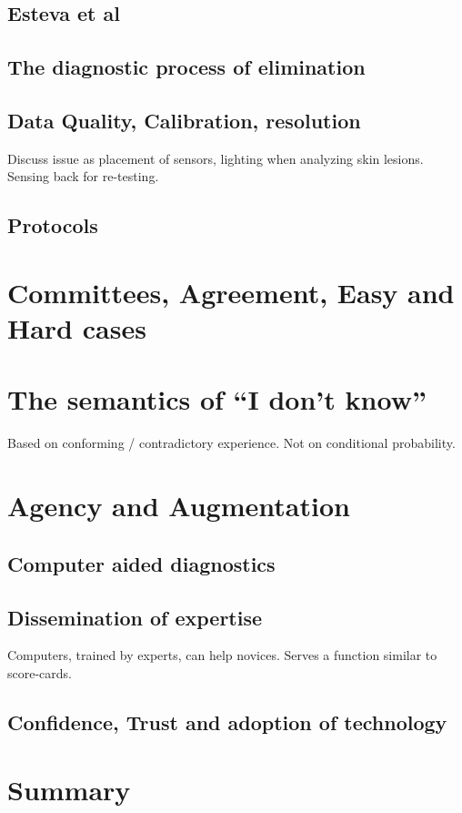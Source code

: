 \documentclass[fleqn,10pt]{wlscirep}
\begin{document}
\subsection*{Esteva et al}
\subsection*{The diagnostic process of elimination}
\subsection*{Data Quality, Calibration, resolution}
Discuss issue as placement of sensors, lighting when analyzing skin
lesions. Sensing back for re-testing.
\subsection*{Protocols}

\section*{Committees, Agreement, Easy and Hard cases}

\section*{The semantics of ``I don't know''}
Based on conforming / contradictory experience. Not on conditional
probability.

\section*{Agency and Augmentation}
\subsection*{Computer aided diagnostics}
\subsection*{Dissemination of expertise}
Computers, trained by experts, can help novices.  Serves a function
similar to score-cards.
\subsection*{Confidence, Trust and adoption of technology}
\section*{Summary}

 


\end{document}
